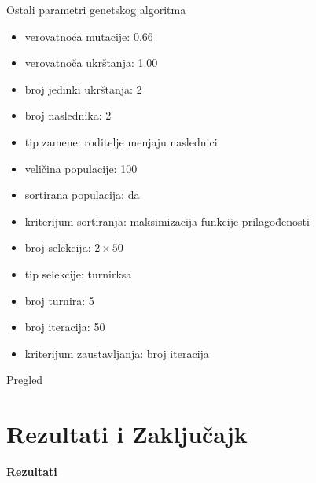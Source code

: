 \documentclass[aspectratio=169,xcolor=dvipsnames]{beamer}
\begin{document}
\begin{frame}{Ostali parametri genetskog algoritma}
    \begin{itemize}
        \item verovatnoća mutacije: 0.66
        \item verovatnoča ukrštanja: 1.00
        \item broj jedinki ukrštanja: 2
        \item broj naslednika: 2
        \item tip zamene: roditelje menjaju naslednici
        \item veličina populacije: 100
        \item sortirana populacija: da
        \item kriterijum sortiranja: maksimizacija funkcije prilagođenosti
        \item broj selekcija: $2 \times 50$
        \item tip selekcije: turnirksa
        \item broj turnira: 5
        \item broj iteracija: 50
        \item kriterijum zaustavljanja: broj iteracija
    \end{itemize}
\end{frame}


\begin{frame}{Pregled}
    \tableofcontents
\end{frame}

\section{Rezultati i Zaključajk}

\begin{frame}
    \Huge{\centerline{\textbf{Rezultati}}}
\end{frame}

\end{document}
